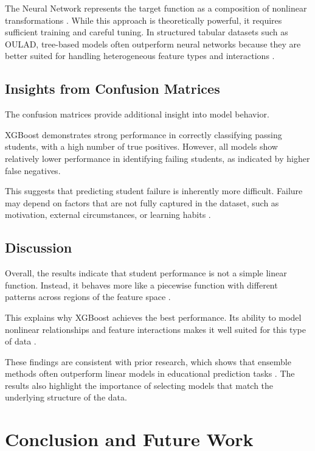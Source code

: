\documentclass[conference]{IEEEtran}
\begin{document}
The Neural Network represents the target function as a composition of nonlinear transformations \cite{chong2025}. While this approach is theoretically powerful, it requires sufficient training and careful tuning. In structured tabular datasets such as OULAD, tree-based models often outperform neural networks because they are better suited for handling heterogeneous feature types and interactions \cite{sitompul2025}.
\subsection{Insights from Confusion Matrices}

The confusion matrices provide additional insight into model behavior.

XGBoost demonstrates strong performance in correctly classifying passing students, with a high number of true positives. However, all models show relatively lower performance in identifying failing students, as indicated by higher false negatives.

This suggests that predicting student failure is inherently more difficult. Failure may depend on factors that are not fully captured in the dataset, such as motivation, external circumstances, or learning habits \cite{nayak2023, chen2015}.

\subsection{Discussion}

Overall, the results indicate that student performance is not a simple linear function. Instead, it behaves more like a piecewise function with different patterns across regions of the feature space \cite{ki2026}.

This explains why XGBoost achieves the best performance. Its ability to model nonlinear relationships and feature interactions makes it well suited for this type of data \cite{elarifi2026, chukwuemeka2026}.

These findings are consistent with prior research, which shows that ensemble methods often outperform linear models in educational prediction tasks \cite{sitompul2025, chong2025}. The results also highlight the importance of selecting models that match the underlying structure of the data.
\section{Conclusion and Future Work}
\end{document}
